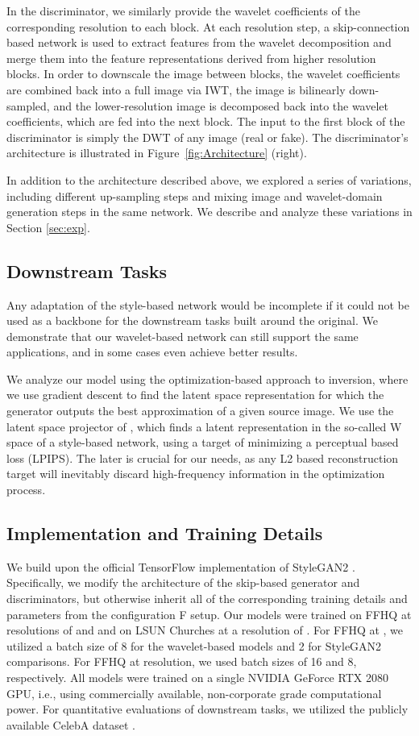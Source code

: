 \documentclass[final]{CVPR2021/cvpr}
\begin{document}
In the discriminator, we similarly provide the wavelet coefficients of the corresponding resolution to each block. At each resolution step, a skip-connection based network is used to extract features from the wavelet decomposition and merge them into the feature representations derived from higher resolution blocks. In order to downscale the image between blocks, the wavelet coefficients are combined back into a full image via IWT, the image is bilinearly down-sampled, and the lower-resolution image is decomposed back into the wavelet coefficients, which are fed into the next block. The input to the first block of the discriminator is simply the DWT of any image (real or fake). The discriminator's architecture is illustrated in Figure~\ref{fig:Architecture} (right).

In addition to the architecture described above, we explored a series of variations, including different up-sampling steps and mixing image and wavelet-domain generation steps in the same network. We describe and analyze these variations in Section \ref{sec:exp}.

\subsection{Downstream Tasks} \label{sec:inversion}
Any adaptation of the style-based network would be incomplete if it could not be used as a backbone for the downstream tasks built around the original. We demonstrate that our wavelet-based network can still support the same applications, and in some cases even achieve better results.

We analyze our model using the optimization-based approach to inversion, where we use gradient descent to find the latent space representation for which the generator outputs the best approximation of a given source image. We use the latent space projector of \citet{karras2020analyzing}, which finds a latent representation in the so-called W space of a style-based network, using a target of minimizing a perceptual based loss (LPIPS). The later is crucial for our needs, as any L2 based reconstruction target will inevitably discard high-frequency information in the optimization process.

\subsection{Implementation and Training Details}
We build upon the official TensorFlow implementation of StyleGAN2 \citep{karras2020analyzing}. Specifically, we modify the architecture of the skip-based generator and discriminators, but otherwise inherit all of the corresponding training details and parameters from the configuration F setup. Our models were trained on FFHQ at resolutions of  and  and on LSUN Churches at a resolution of . For FFHQ at , we utilized a batch size of 8 for the wavelet-based models and 2 for StyleGAN2 comparisons. For FFHQ at  resolution, we used batch sizes of 16 and 8, respectively. All models were trained on a single NVIDIA GeForce RTX 2080 GPU, i.e., using commercially available, non-corporate grade computational power.
For quantitative evaluations of downstream tasks, we utilized the publicly available CelebA dataset \cite{liu2018large}. 
\end{document}
